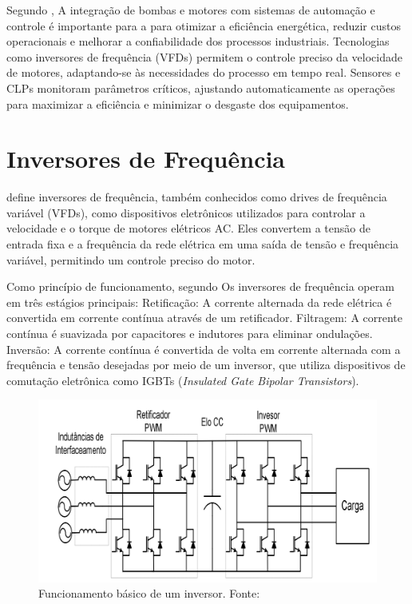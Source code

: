 Segundo \cite {Groover}, A integração de bombas e motores com sistemas de automação e controle é importante para a para otimizar a eficiência energética, reduzir custos operacionais e melhorar a confiabilidade dos processos industriais. Tecnologias como inversores de frequência (VFDs) permitem o controle preciso da velocidade de motores, adaptando-se às necessidades do processo em tempo real. Sensores e CLPs monitoram parâmetros críticos, ajustando automaticamente as operações para maximizar a eficiência e minimizar o desgaste dos equipamentos.


\section{Inversores de Frequência}

\cite {hashid} define inversores de frequência, também conhecidos como drives de frequência variável (VFDs), como dispositivos eletrônicos utilizados para controlar a velocidade e o torque de motores elétricos AC. Eles convertem a tensão de entrada fixa e a frequência da rede elétrica em uma saída de tensão e frequência variável, permitindo um controle preciso do motor.

Como princípio de funcionamento, segundo \cite {hashid} Os inversores de frequência operam em três estágios principais: Retificação: A corrente alternada da rede elétrica é convertida em corrente contínua através de um retificador. Filtragem: A corrente contínua é suavizada por capacitores e indutores para eliminar ondulações. Inversão: A corrente contínua é convertida de volta em corrente alternada com a frequência e tensão desejadas por meio de um inversor, que utiliza dispositivos de comutação eletrônica como IGBTs (\textit{Insulated Gate Bipolar Transistors}).

\begin{figure}[h]
	\centering
	\label{fig:modelagem}
		\includegraphics[keepaspectratio=true,scale=0.3]{figuras/inversor.png}
	\caption{Funcionamento básico de um inversor. Fonte: \cite{SBA}}
\end{figure}

